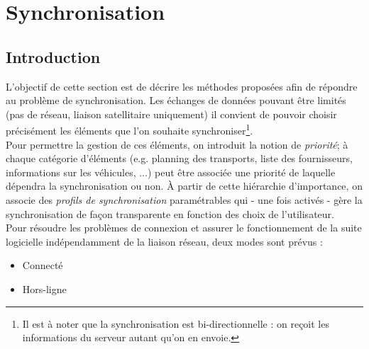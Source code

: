 \section{Synchronisation}
% 

\subsection{Introduction}
L'objectif de cette section est de décrire les méthodes proposées afin de répondre au problème de synchronisation. Les échanges de données pouvant être limités (pas de réseau, liaison satellitaire uniquement) il convient de pouvoir choisir précisément les éléments que l'on souhaite synchroniser\footnote{Il est à noter que la synchronisation est bi-directionnelle : on reçoit les informations du serveur autant qu'on en envoie.}.\\
Pour permettre la gestion de ces éléments, on introduit la notion de \emph{priorité}; à chaque catégorie d'éléments (e.g. planning des transports, liste des fournisseurs, informations sur les véhicules, ...) peut être associée une priorité de laquelle dépendra la synchronisation ou non. À partir de cette \og{}hiérarchie d'importance\fg{}, on associe des \emph{profils de synchronisation} paramétrables qui - une fois activés - gère la synchronisation de façon transparente en fonction des choix de l'utilisateur.\\
Pour résoudre les problèmes de connexion et assurer le fonctionnement de la suite logicielle indépendamment de la liaison réseau, deux modes sont prévus :
\begin{itemize}
    \item Connecté
    \item Hors-ligne
\end{itemize}
